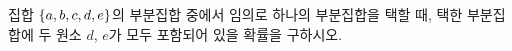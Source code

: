 집합 $\{a{,}\mkern3mu\mathopen{}b{,}\mkern3mu\mathopen{}c{,}\mkern3mu\mathopen{}d{,}\mkern3mu\mathopen{}e\}$의 부분집합 중에서 임의로 하나의 부분집합을 택할 때, 택한 부분집합에 두 원소 $d$, $e$가 모두 포함되어 있을 확률을 구하시오.
